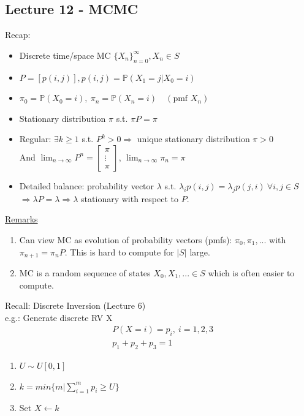 \documentclass[12pt, letterpaper]{article}
\begin{document}
\subsection{Lecture 12 - MCMC}
Recap:
\begin{itemize}
    \item Discrete time/space MC $\{X_n\}_{n=0}^\infty, X_n \in S$
    \item $P = [p(i,j)], p(i,j) = \mathbb{P}(X_1 = j | X_0 = i)$
    \item $\pi_0 = \mathbb{P}(X_0 = i),\ \pi_n = \mathbb{P}(X_n=i)\quad (\text{pmf }X_n)$
    \item Stationary distribution $\pi$ s.t. $\pi P = \pi$ 
    \item Regular: $\exists k\ge 1 $ s.t. $P^k > 0 \Rightarrow$ unique stationary distribution $\pi >0$ \\
        And $\lim_{n\rightarrow \infty} P^n = \begin{bmatrix}
            \pi \\ \vdots \\ \pi
        \end{bmatrix}$, $\lim_{n\rightarrow\infty} \pi_n = \pi$
    \item Detailed balance: probability vector $\lambda$ s.t. $\lambda_i p(i,j)=\lambda_j p(j,i)\ \forall i,j \in S$\\
    $\Rightarrow \lambda P = \lambda \Rightarrow \lambda $ stationary with respect to $P$.
\end{itemize}

\noindent\underline{Remarks}
\begin{enumerate}
    \item Can view MC as evolution of probability vectors (pmfs): $\pi_0, \pi_1, ...$ with $\pi_{n+1} = \pi_n P$.
    This is hard to compute for $|S|$ large.
    \item MC is a random sequence of states $X_0,X_1,... \in S$ which is often easier to compute.
\end{enumerate}

\noindent Recall: Discrete Inversion (Lecture 6) \\
e.g.: Generate discrete RV X  
\begin{align*}
    &P(X=i) = p_i,\ i=1,2,3 \\
    &p_1 + p_2 +p_3 = 1
\end{align*}
\begin{enumerate}
    \item $U \sim U[0,1]$
    \item $k = min\{m | \sum_{i=1}^{m} p_i \ge U\}$
    \item Set $X \leftarrow k$
\end{enumerate}
\end{document}

